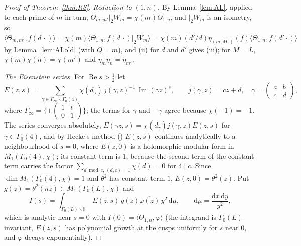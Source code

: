 ﻿\documentclass[11pt]{amsart}
\theoremstyle{remark}
\newcommand{\HH}{\mathbb{H}}
\newcommand{\dd}{\mathrm{d}}
\begin{document}
\begin{proof}[Proof of Theorem~\ref{thm:RS}]
\emph{Reduction to $(1,n)$.} By Lemma~\ref{lem:AL}, applied to each prime of $m$ in turn, $\Theta_{m,m'}|_2W_m=\chi(m)\Theta_{1,n}$, and $|_2W_m$ is an isometry, so $\langle\Theta_{m,m'},f(d\,\cdot)\rangle=\chi(m)\langle\Theta_{1,n},f(d\,\cdot)|_2W_m\rangle=\chi(m)(d'/d)\eta_{(m,M_1)}(f)\langle\Theta_{1,n},f(d'\cdot)\rangle$ by Lemma~\ref{lem:ALold} (with $Q=m$), and (ii) for $d$ and $d'$ gives (iii); for $M=L$, $\chi(m)\chi(n)=\chi(m')$ and $\eta_m\eta_n=\eta_{m'}$.

\emph{The Eisenstein series.} For $\operatorname{Re}s>\frac12$ let
\[
E(z,s)=\sum_{\gamma\in\Gamma_\infty\backslash\Gamma_0(4)}\chi(d_\gamma)\,j(\gamma,z)^{-1}\,\operatorname{Im}(\gamma z)^s,\qquad j(\gamma,z)=cz+d,\quad\gamma=\left(\begin{smallmatrix}a&b\\c&d\end{smallmatrix}\right),
\]
where $\Gamma_\infty=\{\pm\left(\begin{smallmatrix}1&t\\0&1\end{smallmatrix}\right)\}$; the terms for $\gamma$ and $-\gamma$ agree because $\chi(-1)=-1$. The series converges absolutely, $E(\gamma z,s)=\chi(d_\gamma)j(\gamma,z)E(z,s)$ for $\gamma\in\Gamma_0(4)$, and by Hecke's method (\cite[Chapter~4]{DS}) $E(z,s)$ continues analytically to a neighbourhood of $s=0$, where $E(z,0)$ is a holomorphic modular form in $M_1(\Gamma_0(4),\chi)$; its constant term is $1$, because the second term of the constant term carries the factor $\sum_{d\bmod c,\,(d,c)=1}\chi(d)=0$ for $4\mid c$. Since $\dim M_1(\Gamma_0(4),\chi)=1$ and $\theta^2$ has constant term $1$, $E(z,0)=\theta^2(z)$. Put $g(z)=\theta^2(nz)\in M_1(\Gamma_0(L),\chi)$ and
\[
I(s)=\int_{\Gamma_0(L)\backslash\HH}E(z,s)\,g(z)\overline{\varphi(z)}\,y^{2}\,\dd\mu,\qquad\dd\mu=\frac{\dd x\,\dd y}{y^2},
\]
which is analytic near $s=0$ with $I(0)=\langle\Theta_{1,n},\varphi\rangle$ (the integrand is $\Gamma_0(L)$-invariant, $E(z,s)$ has polynomial growth at the cusps uniformly for $s$ near $0$, and $\varphi$ decays exponentially).


\end{proof}
\end{document}
